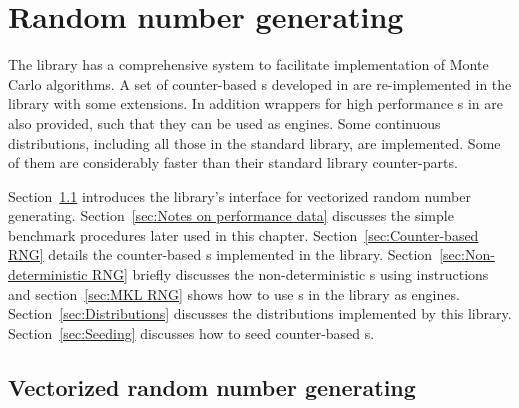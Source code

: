 \chapter{Random number generating}
\label{chap:Random number generating}

The library has a comprehensive \rng system to facilitate implementation of
Monte Carlo algorithms. A set of counter-based \rng{}s developed in
\textcite{Salmon:2011um} are re-implemented in the library with some
extensions. In addition wrappers for high performance \rng{}s in \mkl are also
provided, such that they can be used as \cppoo \rng engines. Some continuous
distributions, including all those in the standard library, are implemented.
Some of them are considerably faster than their standard library counter-parts.

Section~\ref{sec:Vectorized random number generating} introduces the library's
interface for vectorized random number generating. Section~\ref{sec:Notes on
  performance data} discusses the simple benchmark procedures later used in
this chapter. Section~\ref{sec:Counter-based RNG} details the counter-based
\rng{}s implemented in the library. Section~\ref{sec:Non-deterministic RNG}
briefly discusses the non-deterministic \rng{}s using \rdrand instructions and
section~\ref{sec:MKL RNG} shows how to use \rng{}s in the \mkl library as
\cppoo engines. Section~\ref{sec:Distributions} discusses the distributions
implemented by this library. Section~\ref{sec:Seeding} discusses how to seed
counter-based \rng{}s.

\section{Vectorized random number generating}
\label{sec:Vectorized random number generating}

